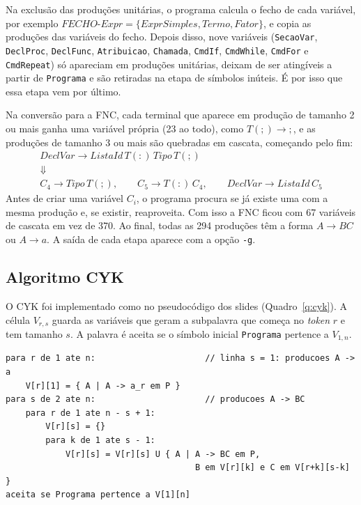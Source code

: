 \documentclass[12pt,a4paper]{article}
\newcommand{\fonte}[1][Elaborado pelos autores (2026).]{%
  \par\vspace{3pt}{\footnotesize Fonte: #1}\par}
\newcommand{\code}[1]{\texttt{#1}}
\begin{document}
Na exclusão das produções unitárias, o programa calcula o fecho de cada variável, por exemplo
$\textit{FECHO-Expr} = \{\mathit{ExprSimples},\allowbreak \mathit{Termo},\allowbreak
\mathit{Fator}\}$, e copia as produções das variáveis do fecho. Depois disso, nove variáveis
(\code{SecaoVar}, \code{DeclProc}, \code{DeclFunc}, \code{Atribuicao}, \code{Chamada},
\code{CmdIf}, \code{CmdWhile}, \code{CmdFor} e \code{CmdRepeat}) só apareciam em produções
unitárias, deixam de ser atingíveis a partir de \code{Programa} e são retiradas na etapa de
símbolos inúteis. É por isso que essa etapa vem por último.

Na conversão para a FNC, cada terminal que aparece em produção de tamanho 2 ou mais ganha uma
variável própria (23 ao todo), como $T(\mathtt{;}) \to \mathtt{;}$, e as produções de tamanho 3
ou mais são quebradas em cascata, começando pelo fim:
\begin{gather*}
\mathit{DeclVar} \to \mathit{ListaId}\, T(\mathtt{:})\, \mathit{Tipo}\, T(\mathtt{;})
\\
\Downarrow
\\
C_4 \to \mathit{Tipo}\, T(\mathtt{;}),\qquad C_5 \to T(\mathtt{:})\, C_4,\qquad
\mathit{DeclVar} \to \mathit{ListaId}\, C_5
\end{gather*}
Antes de criar uma variável $C_i$, o programa procura se já existe uma com a mesma produção e,
se existir, reaproveita. Com isso a FNC ficou com 67 variáveis de cascata em vez de 370. Ao
final, todas as 294 produções têm a forma $A \to BC$ ou $A \to a$. A saída de cada etapa aparece
com a opção \code{-g}.

\subsection{Algoritmo CYK}

O CYK foi implementado como no pseudocódigo dos slides (Quadro~\ref{q:cyk}). A célula
$V_{r,s}$ guarda as variáveis que geram a subpalavra que começa no \textit{token} $r$ e tem
tamanho $s$. A palavra é aceita se o símbolo inicial \code{Programa} pertence a $V_{1,n}$.

\begin{quadro}[H]
\caption{Pseudocódigo do CYK implementado em \code{cyk.c}}\label{q:cyk}
\begin{lstlisting}
para r de 1 ate n:                      // linha s = 1: producoes A -> a
    V[r][1] = { A | A -> a_r em P }
para s de 2 ate n:                      // producoes A -> BC
    para r de 1 ate n - s + 1:
        V[r][s] = {}
        para k de 1 ate s - 1:
            V[r][s] = V[r][s] U { A | A -> BC em P,
                                      B em V[r][k] e C em V[r+k][s-k] }
aceita se Programa pertence a V[1][n]
\end{lstlisting}
\fonte
\end{quadro}
\end{document}
